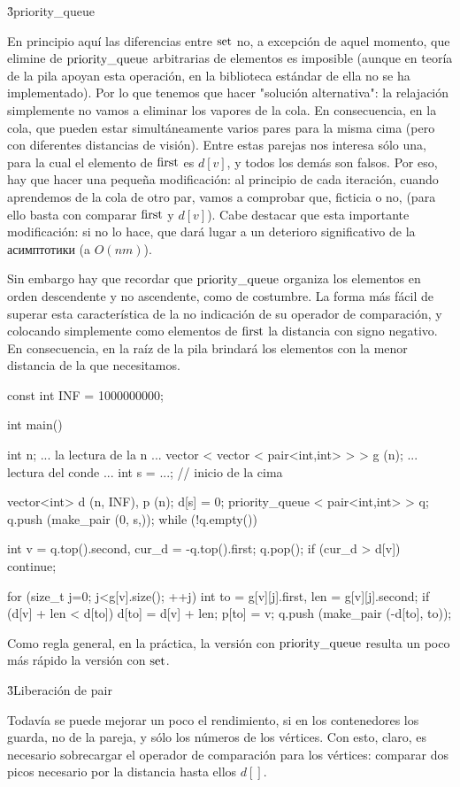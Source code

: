 \h3{priority_queue}

En principio aquí las diferencias entre $\rm set$ no, a excepción de aquel momento, que elimine de $\rm priority\_queue$ arbitrarias de elementos es imposible (aunque en teoría de la pila apoyan esta operación, en la biblioteca estándar de ella no se ha implementado). Por lo que tenemos que hacer "solución alternativa": la relajación simplemente no vamos a eliminar los vapores de la cola. En consecuencia, en la cola, que pueden estar simultáneamente varios pares para la misma cima (pero con diferentes distancias de visión). Entre estas parejas nos interesa sólo una, para la cual el elemento de $\rm first$ es $d[v]$, y todos los demás son falsos. Por eso, hay que hacer una pequeña modificación: al principio de cada iteración, cuando aprendemos de la cola de otro par, vamos a comprobar que, ficticia o no, (para ello basta con comparar $\rm first$ y $d[v]$). Cabe destacar que esta importante modificación: si no lo hace, que dará lugar a un deterioro significativo de la асимптотики (a $O(nm)$).

Sin embargo hay que recordar que $\rm priority\_queue$ organiza los elementos en orden descendente y no ascendente, como de costumbre. La forma más fácil de superar esta característica de la no indicación de su operador de comparación, y colocando simplemente como elementos de $\rm first$ la distancia con signo negativo. En consecuencia, en la raíz de la pila brindará los elementos con la menor distancia de la que necesitamos.

\code
const int INF = 1000000000;

int main() {
int n;
... la lectura de la n ...
vector < vector < pair<int,int> > > g (n);
... lectura del conde ...
int s = ...; // inicio de la cima

vector<int> d (n, INF), p (n);
d[s] = 0;
priority_queue < pair<int,int> > q;
q.push (make_pair (0, s,));
while (!q.empty()) {
int v = q.top().second, cur_d = -q.top().first;
q.pop();
if (cur_d > d[v]) continue;

for (size_t j=0; j<g[v].size(); ++j) {
int to = g[v][j].first,
len = g[v][j].second;
if (d[v] + len < d[to]) {
d[to] = d[v] + len;
p[to] = v;
q.push (make_pair (-d[to], to));
}
}
}
}
\endcode

Como regla general, en la práctica, la versión con $\rm priority\_queue$ resulta un poco más rápido la versión con $\rm set$.

\h3{Liberación de pair}

Todavía se puede mejorar un poco el rendimiento, si en los contenedores los guarda, no de la pareja, y sólo los números de los vértices. Con esto, claro, es necesario sobrecargar el operador de comparación para los vértices: comparar dos picos necesario por la distancia hasta ellos $d[]$.

